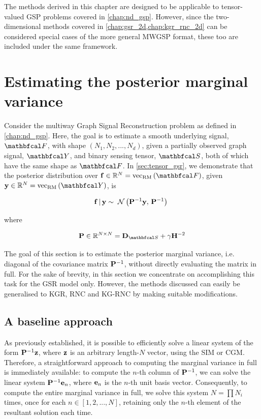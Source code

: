 The methods derived in this chapter are designed to be applicable to tensor-valued GSP problems covered in \cref{chap:nd_gsp}. However, since the two-dimensional methods covered in \cref{chap:gsr_2d,chap:kgr_rnc_2d} can be considered special cases of the more general MWGSP format, these too are included under the same framework. 

\section{Estimating the posterior marginal variance}

\label{sec:post_var_pred}

Consider the multiway Graph Signal Reconstruction problem as defined in \cref{chap:nd_gsp}. Here, the goal is to estimate a smooth underlying signal, $\Ft$, with shape $(N_1, N_2, ..., N_d)$, given a partially observed graph signal, $\Yt$, and binary sensing tensor, $\St$, both of which have the same shape as $\Ft$. In \cref{sec:tensor_gsr}, we demonstrate that the posterior distribution over $\f \in \R^N = \vecrm{\Ft}$, given $\y \in \R^N  = \vecrm{\Yt}$, is

\begin{equation}
    \mathbf{f} \, | \, \mathbf{y} \sim \; \mathcal{N}\left(\mathbf{P}^{-1} \mathbf{y}, \, \mathbf{P}^{-1}\right) \;
\end{equation}

where 

\begin{equation}
    \label{eq:P_posterior}
    \PP \in \R^{N \times N} = \D_{\St} + \gamma \HH^{-2}
\end{equation}

The goal of this section is to estimate the posterior marginal variance, i.e. diagonal of the covariance matrix $\mathbf{P}^{-1}$, without directly evaluating the matrix in full. For the sake of brevity, in this section we concentrate on accomplishing this task for the GSR model only. However, the methods discussed can easily be generalised to KGR, RNC and KG-RNC by making suitable modifications. 

\subsection{A baseline approach}

\label{sec:var_baseline}

As previously established, it is possible to efficiently solve a linear system of the form $\mathbf{P}^{-1} \mathbf{z}$, where $\mathbf{z}$ is an arbitrary length-$N$ vector, using the SIM or CGM. Therefore, a straightforward approach to computing the marginal variance in full is immediately available: to compute the $n$-th column of $\mathbf{P}^{-1}$, we can solve the linear system $\mathbf{P}^{-1} \mathbf{e}_n$, where $\mathbf{e}_n$ is the $n$-th unit basis vector. Consequently, to compute the entire marginal variance in full, we solve this system $N = \prod N_i$ times, once for each $n \in [1, 2, ..., N]$, retaining only the $n$-th element of the resultant solution each time.
    
